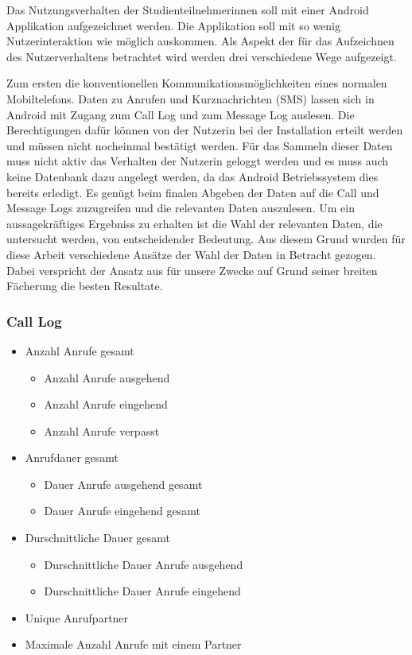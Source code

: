 Das Nutzungsverhalten der Studienteilnehmerinnen soll mit einer Android Applikation aufgezeichnet werden.
Die Applikation soll mit so wenig Nutzerinteraktion wie möglich auskommen.
Als Aspekt der für das Aufzeichnen des Nutzerverhaltens betrachtet wird werden drei verschiedene Wege aufgezeigt.
\par
Zum ersten die konventionellen Kommunikationsmöglichkeiten eines normalen Mobiltelefons.
Daten zu Anrufen und Kurznachrichten (SMS) lassen sich in Android mit Zugang zum Call Log und zum Message Log auslesen.
Die Berechtigungen dafür können von der Nutzerin bei der Installation erteilt werden und müssen nicht nocheinmal bestätigt werden.
Für das Sammeln dieser Daten muss nicht aktiv das Verhalten der Nutzerin geloggt werden und es muss auch keine Datenbank dazu angelegt werden,
da das Android Betriebssystem dies bereits erledigt.
Es genügt beim finalen Abgeben der Daten auf die Call und Message Logs zuzugreifen und die relevanten Daten auszulesen.
Um ein aussagekräftiges Ergebniss zu erhalten ist die Wahl der relevanten Daten, die untersucht werden, von entscheidender Bedeutung. 
Aus diesem Grund wurden für diese Arbeit verschiedene Ansätze der Wahl der Daten in Betracht gezogen. 
Dabei verspricht der Ansatz aus \cite{chittaranjan2011s} für unsere Zwecke auf Grund seiner breiten Fächerung die besten Resultate.
\par

\subsubsection{Call Log}

\begin{itemize}
    \item Anzahl Anrufe gesamt
    \begin{itemize}
        \item Anzahl Anrufe ausgehend
        \item Anzahl Anrufe eingehend
        \item Anzahl Anrufe verpasst
    \end{itemize}

    \item Anrufdauer gesamt
    \begin{itemize}
        \item Dauer Anrufe ausgehend gesamt
        \item Dauer Anrufe eingehend gesamt
    \end{itemize}

    \item Durschnittliche Dauer gesamt
    \begin{itemize}
        \item Durschnittliche Dauer Anrufe ausgehend
        \item Durschnittliche Dauer Anrufe eingehend
    \end{itemize}

    \item Unique Anrufpartner
    \item Maximale Anzahl Anrufe mit einem Partner

\end{itemize}

